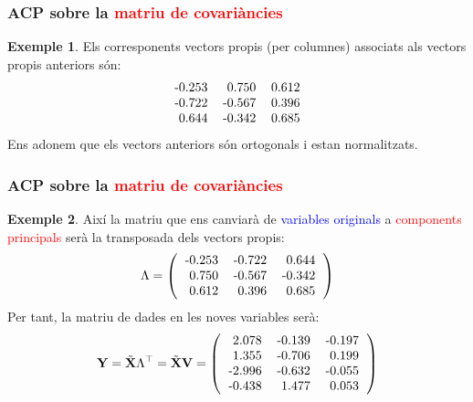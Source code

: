 \documentclass[12pt,t]{beamer}
\newcommand{\red}[1]{\textcolor{red}{#1}}
\newcommand{\blue}[1]{\textcolor{blue}{#1}}
\theoremstyle{plain}
\theoremstyle{definition}
\newtheorem{exemple}{Exemple}
\begin{document}
\begin{frame}
\frametitle{ACP sobre la \red{matriu de covariàncies}}
\begin{exemple}
Els corresponents vectors propis (per columnes) associats als vectors propis anteriors són:
\[
\begin{tabular}{rrr}
  -0.253 & 0.750 & 0.612 \\ 
  -0.722 & -0.567 & 0.396 \\ 
  0.644 & -0.342 & 0.685 \\ 
  \end{tabular}\]
Ens adonem que els vectors anteriors són ortogonals i estan normalitzats.


\end{exemple}
\end{frame}

\begin{frame}
\frametitle{ACP sobre la \red{matriu de covariàncies}}
\begin{exemple}
{\small
Així la matriu que ens canviarà de \blue{variables originals} a \red{components principals} serà la transposada dels vectors propis:
\[
\Lambda=
\left(
\begin{tabular}{rrr}
  -0.253 & -0.722 & 0.644 \\ 
  0.750 & -0.567 & -0.342 \\ 
  0.612 & 0.396 & 0.685 \\ 
  \end{tabular}\right)
\]
Per tant, la matriu de dades en les noves variables serà:
\[
\mathbf{Y}=\tilde{\mathbf{X}}\Lambda^\top = \tilde{\mathbf{X}}\mathbf{V}=
\left(
\begin{tabular}{rrr}
  2.078 & -0.139 & -0.197 \\ 
  1.355 & -0.706 & 0.199 \\ 
  -2.996 & -0.632 & -0.055 \\ 
  -0.438 & 1.477 & 0.053 \\ 
  \end{tabular}\right)
\]
}
\end{exemple}
\end{frame}
\end{document}
